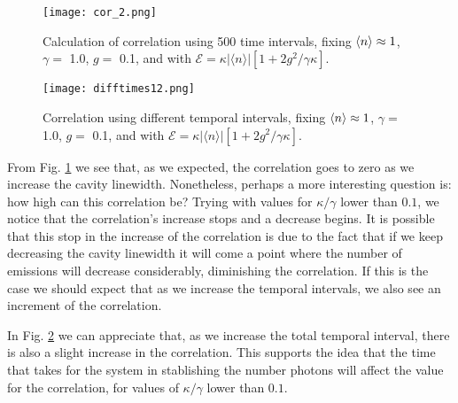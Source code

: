 \documentclass[conference]{IEEEtran}
\begin{document}
\begin{center}
\begin{figure}[t!]
\begin{center}
\texttt{[image: cor\_2.png]}
\caption{\small{Calculation of correlation using 500 time intervals, fixing $\expval{n} \approx 1$, $\gamma =$ 1.0, $g = $ 0.1, and with  $\mathcal{E} =  \kappa |\langle n \rangle|[1 + 2g^2/\gamma \kappa]$.}} \label{corrxy}
\end{center}  
\end{figure}
\end{center}

\begin{center}
\begin{figure}[h!]
\begin{center}
\texttt{[image: difftimes12.png]}
\caption{\small{Correlation using different temporal intervals, fixing $\expval{n} \approx 1$, $\gamma =$ 1.0, $g =$ 0.1, and with  $\mathcal{E} =  \kappa |\langle n \rangle|[1 + 2g^2/\gamma \kappa]$.}}  \label{errorzz}
\end{center}
\end{figure}
\end{center}
From Fig. \ref{corrxy} we see that, as we expected, the correlation goes to zero as we increase the cavity linewidth. Nonetheless, perhaps a more interesting question is: how high can this correlation be? Trying with values for $\kappa/\gamma$ lower than $0.1$, we notice that the correlation's increase stops and a decrease begins. It is possible that this stop in the increase of the correlation is due to the fact that if we keep decreasing the cavity linewidth it will come a point where the number of emissions will decrease considerably, diminishing the correlation. If this is the case we should expect that as we increase the temporal intervals, %
we also see an increment of the correlation.


In Fig. \ref{errorzz} we can appreciate that, as we increase the total temporal interval, there is also a slight increase in the correlation. This supports the idea that the time that takes for the system in stablishing the number photons will affect the value for the correlation, for values of $\kappa/\gamma$ lower than $0.1$.
\end{document}
